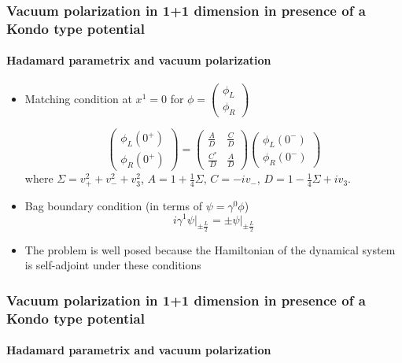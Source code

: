 \documentclass[french]{beamer}
\begin{document}
\begin{frame}
\frametitle{Vacuum polarization in 1+1 dimension in presence of a Kondo type potential}
\framesubtitle{Hadamard parametrix and vacuum polarization}

\begin{itemize}
\item Matching condition at $x^1 = 0$ for $\phi =
\begin{pmatrix}
\phi_L \\
\phi_R
\end{pmatrix}$

\begin{equation*}
\begin{pmatrix}
\phi_L(0^+) \\
\phi_R(0^+)
\end{pmatrix} = \begin{pmatrix}
\frac{A}{D}  & \frac{C}{D} \\
\frac{C^*}{D} & \frac{A}{D}
\end{pmatrix}\begin{pmatrix}
\phi_L(0^-) \\
\phi_R(0^-)
\end{pmatrix}
\end{equation*}
where  $\Sigma = v_+ ^ 2 + v_- ^ 2 + v_3 ^ 2$, $A = 1+ \frac{1}{4}\Sigma$, $C = -iv_-$, $D = 1-\frac{1}{4}\Sigma + iv_3$.

\item Bag boundary condition (in terms of $\psi = \gamma^0\phi$)
\begin{equation*}
i\gamma^1 \psi \Big\vert_{\pm \frac{L}{2}} = \pm \psi \Big\vert_{\pm \frac{L}{2}}
\end{equation*}

\item The problem is well posed because the Hamiltonian of the dynamical system is self-adjoint under these conditions

\end{itemize}

\end{frame}
\begin{frame}
\frametitle{Vacuum polarization in 1+1 dimension in presence of a Kondo type potential}
\framesubtitle{Hadamard parametrix and vacuum polarization}


\end{frame}
\begin{frame}
\frametitle{}
\framesubtitle{}


\end{frame}
\begin{frame}
\frametitle{}
\framesubtitle{}


\end{frame}
\begin{frame}
\frametitle{}
\framesubtitle{}


\end{frame}
\begin{frame}
\frametitle{}
\framesubtitle{}


\end{frame}
\end{document}
